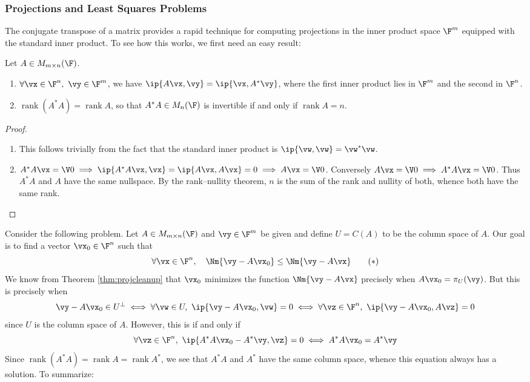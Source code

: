 \subsubsection*{Projections and Least Squares Problems}\def\rank{\operatorname{rank}}

The conjugate transpose of a matrix provides a rapid technique for computing projections in the inner product space $\F^m$ equipped with the standard inner product. To see how this works, we first need an easy result:
\begin{thm}{}{}
Let $A\in M_{m\times n}(\F)$.
\begin{enumerate}
  \item $\forall\vx\in\F^n,\ \vy\in\F^m$, we have $\ip{A\vx,\vy}=\ip{\vx,A^*\vy}$, where the first inner product lies in $\F^m$ and the second in $\F^n$.
  \item $\rank(A^*A)=\rank A$, so that $A^*A\in M_n(\F)$ is invertible if and only if $\rank A=n$.
\end{enumerate}
\end{thm}

\begin{proof}
\begin{enumerate}
  \item This follows trivially from the fact that the standard inner product is $\ip{\vw,\vw}=\vw^*\vw$.
  \item $A^*A\vx=\V0\implies \ip{A^*A\vx,\vx}=\ip{A\vx,A\vx}=0\implies A\vx=\V0$. Conversely $A\vx=\V0\implies A^*A\vx=\V0$. Thus $A^*A$ and $A$ have the same nullspace. By the rank--nullity theorem, $n$ is the sum of the rank and nullity of both, whence both have the same rank.\qedhere
\end{enumerate}
\end{proof}

Consider the following problem. Let $A\in M_{m\times n}(\F)$ and $\vy\in\F^m$ be given and define $U=C(A)$ to be the column space of $A$. Our goal is to find a vector $\vx_0\in\F^n$ such that
\[\forall \vx\in\F^n,\quad \Nm{\vy-A\vx_0}\le\Nm{\vy-A\vx}\tag{$\ast$}\]
We know from Theorem \ref{thm:projcleanup} that $\vx_0$ minimizes the function $\Nm{\vy-A\vx}$ precisely when $A\vx_0=\pi_U(\vy)$. But this is precisely when
\[\vy-A\vx_0\in U^\perp \iff \forall\vw\in U,\ \ip{\vy-A\vx_0,\vw}=0 \iff \forall\vz\in\F^n,\ \ip{\vy-A\vx_0,A\vz}=0\]
since $U$ is the column space of $A$. However, this is if and only if
\[\forall\vz\in\F^n,\ \ip{A^*A\vx_0-A^*\vy,\vz}=0 \iff A^*A\vx_0=A^*\vy\]
Since $\rank(A^*A)=\rank A=\rank A^*$, we see that $A^*A$ and $A^*$ have the same column space, whence this equation always has a solution. To summarize:

